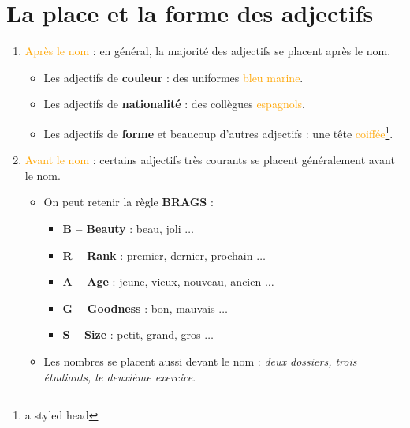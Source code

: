 \documentclass[math,code]{amznotes}
\theoremstyle{remark}
\begin{document}
\section{La place et la forme des adjectifs}

\begin{enumerate}
    \item \textcolor{orange}{Après le nom} : en général, la majorité des adjectifs se placent après le nom.
    \begin{itemize}
        \item Les adjectifs de \textbf{couleur} : des uniformes \textcolor{orange}{bleu marine}.
        \item Les adjectifs de \textbf{nationalité} : des collègues \textcolor{orange}{espagnols}.
        \item Les adjectifs de \textbf{forme} et beaucoup d'autres adjectifs : une tête \textcolor{orange}{coiffée}\footnote{a styled head}.
    \end{itemize}
    
    \item \textcolor{orange}{Avant le nom} : certains adjectifs très courants se placent généralement avant le nom.
    \begin{itemize}
        \item On peut retenir la règle \textbf{BRAGS} :
        \begin{itemize}
            \item \textbf{B -- Beauty} : beau, joli $\dots$
            \item \textbf{R -- Rank} : premier, dernier, prochain $\dots$
            \item \textbf{A -- Age} : jeune, vieux, nouveau, ancien $\dots$
            \item \textbf{G -- Goodness} : bon, mauvais $\dots$
            \item \textbf{S -- Size} : petit, grand, gros $\dots$
        \end{itemize}
        \item Les nombres se placent aussi devant le nom : \textit{deux dossiers, trois étudiants, le deuxième exercice}.
    \end{itemize}


\end{enumerate}
\end{document}
